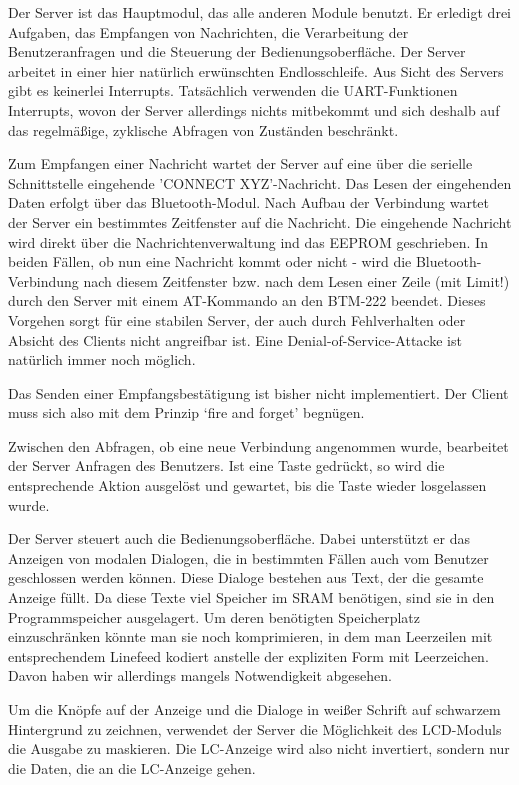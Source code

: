 \documentclass[ngerman]{article}
\begin{document}
Der Server ist das Hauptmodul, das alle anderen Module benutzt. Er erledigt
drei Aufgaben, das Empfangen von Nachrichten, die Verarbeitung der
Benutzeranfragen und die Steuerung der Bedienungsoberfläche. Der Server
arbeitet in einer hier natürlich erwünschten Endlosschleife. Aus Sicht des
Servers gibt es keinerlei Interrupts. Tatsächlich verwenden die UART-Funktionen
Interrupts, wovon der Server allerdings nichts mitbekommt und sich deshalb auf
das re\-gel\-mä\-ßige, zyklische Abfragen von Zuständen beschränkt.

Zum Empfangen einer Nachricht wartet der Server auf eine über die serielle
Schnittstelle eingehende 'CONNECT XYZ'-Nachricht. Das Lesen der eingehenden
Daten erfolgt über das Bluetooth-Modul. Nach Aufbau der Verbindung wartet der
Server ein bestimmtes Zeitfenster auf die Nachricht. Die eingehende Nachricht
wird direkt über die Nachrichtenverwaltung ind das EEPROM ge\-schrie\-ben. In
beiden Fällen, ob nun eine Nachricht kommt oder nicht - wird die
Bluetooth-Verbindung nach diesem Zeitfenster bzw. nach dem Lesen einer Zeile
(mit Limit!) durch den Server mit einem AT-Kommando an den BTM-222 beendet.
Dieses Vorgehen sorgt für eine stabilen Server, der auch durch Fehlverhalten
oder Absicht des Clients nicht angreifbar ist. Eine Denial-of-Service-Attacke
ist natürlich immer noch möglich.

Das Senden einer Empfangsbestätigung ist bisher nicht implementiert. Der Client
muss sich also mit dem Prinzip `fire and forget' begnügen.

Zwischen den Abfragen, ob eine neue Verbindung angenommen wurde, bearbeitet der
Server Anfragen des Benutzers. Ist eine Taste gedrückt, so wird die
entsprechende Aktion ausgelöst und gewartet, bis die Taste wieder losgelassen
wurde.

Der Server steuert auch die Bedienungsoberfläche. Dabei unterstützt er das
Anzeigen von modalen Dialogen, die in bestimmten Fällen auch vom Benutzer
geschlossen werden können. Diese Dialoge bestehen aus Text, der die gesamte
Anzeige füllt. Da diese Texte viel Speicher im SRAM benötigen, sind sie in den
Programmspeicher ausgelagert. Um deren benötigten Speicherplatz
ein\-zu\-schrän\-ken könnte man sie noch komprimieren, in dem man Leerzeilen
mit entsprechendem Linefeed kodiert anstelle der expliziten Form mit
Leerzeichen. Davon haben wir allerdings mangels Notwendigkeit abgesehen.

Um die Knöpfe auf der Anzeige und die Dialoge in weißer Schrift auf
schwarzem Hintergrund zu zeichnen, verwendet der Server die Möglichkeit
des LCD-Moduls die Ausgabe zu maskieren. Die LC-Anzeige wird also nicht
invertiert, sondern nur die Daten, die an die LC-Anzeige gehen.
\end{document}
